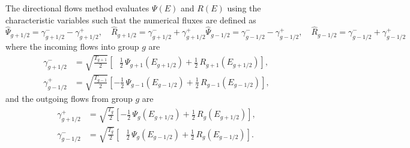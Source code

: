 \documentclass[../main.tex]{subfiles}
\begin{document}
The directional flows method evaluates $\Psi(E)$ and $R(E)$ using the characteristic variables such that the numerical fluxes are defined as
\begin{subequations}
    \begin{equation}
        \hat{\Psi}_{g+1/2} = \gamma_{g+1/2}^- - \gamma_{g+1/2}^+, \quad \hat{R}_{g+1/2} = \gamma_{g+1/2}^- + \gamma_{g+1/2}^+
    \end{equation}
    \begin{equation}
        \hat{\Psi}_{g-1/2} = \gamma_{g-1/2}^- - \gamma_{g-1/2}^+, \quad \hat{R}_{g-1/2} = \gamma_{g-1/2}^- + \gamma_{g-1/2}^+
    \end{equation}
\end{subequations}
where the incoming flows into group $g$ are
\begin{subequations}
    \begin{align}
        \gamma_{g+1/2}^- &= \sqrt{\frac{T_{g+1}}{2}} \left[\,\,\,\,\frac{1}{2} \, \Psi_{g+1}(E_{g+1/2}) + \frac{1}{2} \, R_{g+1}(E_{g+1/2}) \right], \\
        \gamma_{g-1/2}^+ &= \sqrt{\frac{T_{g-1}}{2}} \left[-\frac{1}{2} \, \Psi_{g-1}(E_{g-1/2}) + \frac{1}{2} \, R_{g-1}(E_{g-1/2}) \right],
    \end{align}
\end{subequations}
and the outgoing flows from group $g$ are
\begin{subequations}
    \begin{align}
        \gamma_{g+1/2}^+ &= \sqrt{\frac{T_g}{2}} \left[-\frac{1}{2} \, \Psi_{g}(E_{g+1/2}) + \frac{1}{2} \, R_{g}(E_{g+1/2}) \right], \\
        \gamma_{g-1/2}^- &= \sqrt{\frac{T_g}{2}} \left[\,\,\,\,\frac{1}{2} \, \Psi_{g}(E_{g-1/2}) + \frac{1}{2} \, R_{g}(E_{g-1/2}) \right].
    \end{align}
\end{subequations}
\end{document}
